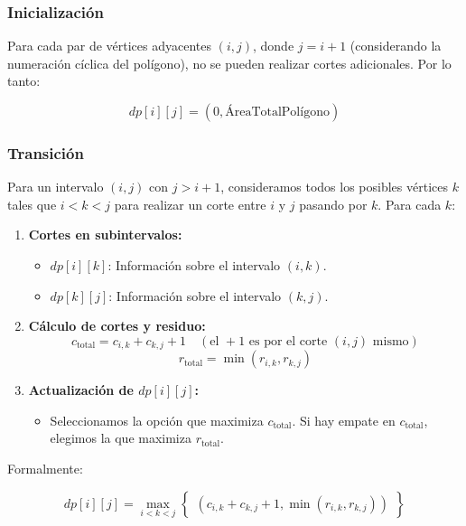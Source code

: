 \documentclass{article}
\begin{document}
\subsubsection{Inicialización}

Para cada par de vértices adyacentes \( (i, j) \), donde \( j = i+1 \) (considerando la numeración cíclica del polígono), no se pueden realizar cortes adicionales. Por lo tanto:

\[
dp[i][j] = (0, \text{ÁreaTotalPolígono})
\]

\subsubsection{Transición}

Para un intervalo \( (i, j) \) con \( j > i+1 \), consideramos todos los posibles vértices \( k \) tales que \( i < k < j \) para realizar un corte entre \( i \) y \( j \) pasando por \( k \). Para cada \( k \):

\begin{enumerate}
    \item \textbf{Cortes en subintervalos:}
    \begin{itemize}
        \item \( dp[i][k] \): Información sobre el intervalo \( (i, k) \).
        \item \( dp[k][j] \): Información sobre el intervalo \( (k, j) \).
    \end{itemize}
    \item \textbf{Cálculo de cortes y residuo:}
    \[
    c_{\text{total}} = c_{i,k} + c_{k,j} + 1 \quad (\text{el } +1 \text{ es por el corte } (i, j) \text{ mismo})
    \]
    \[
    r_{\text{total}} = \min(r_{i,k}, r_{k,j})
    \]
    \item \textbf{Actualización de \( dp[i][j] \):}
    \begin{itemize}
        \item Seleccionamos la opción que maximiza \( c_{\text{total}} \). Si hay empate en \( c_{\text{total}} \), elegimos la que maximiza \( r_{\text{total}} \).
    \end{itemize}
\end{enumerate}

Formalmente:

\[
dp[i][j] = \max_{i < k < j} \left\{
    \begin{array}{ll}
        (c_{i,k} + c_{k,j} + 1, \min(r_{i,k}, r_{k,j}))
    \end{array}
\right\}
\]
\end{document}
